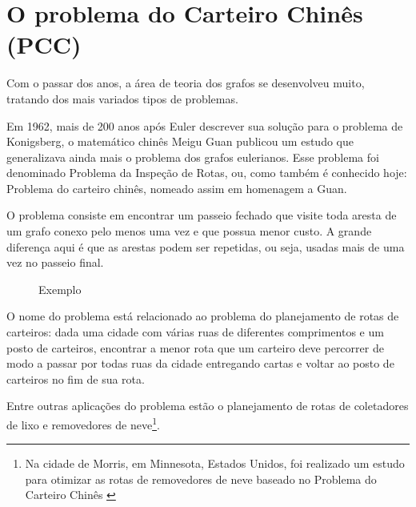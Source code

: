 \section{O problema do Carteiro Chinês (PCC)}

Com o passar dos anos, a área de teoria dos grafos se desenvolveu muito, tratando dos mais variados tipos de problemas.

Em 1962, mais de 200 anos após Euler descrever sua solução para o problema de Konigsberg, o matemático chinês Meigu Guan publicou um estudo que generalizava ainda mais o problema dos grafos eulerianos. 
Esse problema foi denominado Problema da Inspeção de Rotas, ou, como também é conhecido hoje: Problema do carteiro chinês, nomeado assim em homenagem a Guan.

O problema consiste em encontrar um passeio fechado que visite toda aresta de um grafo conexo pelo menos uma vez e que possua menor custo. 
A grande diferença aqui é que as arestas podem ser repetidas, ou seja, usadas mais de uma vez no passeio final.

\begin{wrapfigure}{l}{0.3\textwidth} 
    \centering
	\caption{Exemplo}
	\label{graph}
\end{wrapfigure}

O nome do problema está relacionado ao problema do planejamento de rotas de carteiros: dada uma cidade com várias ruas de diferentes comprimentos e um posto de carteiros, encontrar a menor rota que um carteiro deve percorrer de modo a passar por todas ruas da cidade entregando cartas e voltar ao posto de carteiros no fim de sua rota.

Entre outras aplicações do problema estão o planejamento de rotas de coletadores de lixo e removedores de neve\footnote{Na cidade de Morris, em Minnesota, Estados Unidos, foi realizado um estudo para otimizar as rotas de removedores de neve baseado no Problema do Carteiro Chinês \cite{snow-removal}}.


